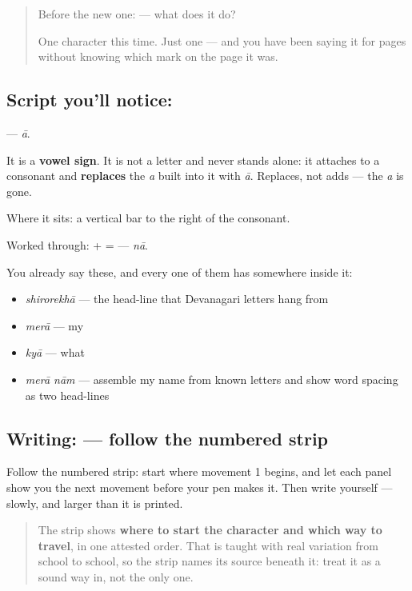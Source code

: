 \begin{quote}
Before the new one:  — what does it do?

One character this time. Just one — and you have been saying it for pages without knowing which mark on the page it was.
\end{quote}

\subsection*{Script you'll notice: }
\textbf{} — \emph{ā}.

It is a \textbf{vowel sign}. It is not a letter and never stands alone: it attaches to a consonant and \textbf{replaces} the \emph{a} built into it with \emph{ā}. Replaces, not adds — the \emph{a} is gone.

Where it sits: a vertical bar to the right of the consonant.

Worked through: \textbf{} + \textbf{} = \textbf{} — \emph{nā}.

You already say these, and every one of them has  somewhere inside it:

\begin{itemize}
\raggedright
  \item \textbf{} \emph{shirorekhā} — the head-line that Devanagari letters hang from
  \item \textbf{} \emph{merā} — my
  \item \textbf{} \emph{kyā} — what
  \item \textbf{ } \emph{merā nām} — assemble my name from known letters and show word spacing as two head-lines
\end{itemize}

\subsection*{Writing:  — follow the numbered strip}

Follow the numbered strip: start where movement 1 begins, and let each panel show you the next movement before your pen makes it. Then write  yourself — slowly, and larger than it is printed.

\begin{quote}
The strip shows \textbf{where to start the character and which way to travel}, in one attested order. That is taught with real variation from school to school, so the strip names its source beneath it: treat it as a sound way in, not the only one.
\end{quote}

